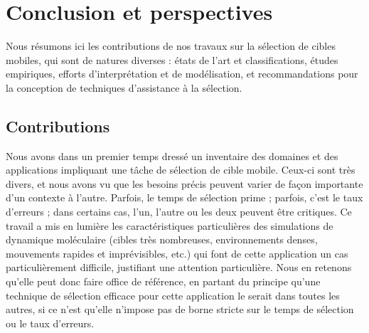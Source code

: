 


\chapter*{Conclusion et perspectives}
\mtcaddchapter %

	Nous résumons ici les contributions de nos travaux sur la sélection de cibles mobiles, qui sont de natures diverses : états de l'art et classifications, études empiriques, efforts d'interprétation et de modélisation, et recommandations pour la conception de techniques d'assistance à la sélection.

	\section*{Contributions}
	Nous avons dans un premier temps dressé un inventaire des domaines et des applications impliquant une tâche de sélection de cible mobile. Ceux-ci sont très divers, et nous avons vu que les besoins précis peuvent varier de façon importante d'un contexte à l'autre. Parfois, le temps de sélection prime ; parfois, c'est le taux d'erreurs ; dans certains cas, l'un, l'autre ou les deux peuvent être critiques. Ce travail a mis en lumière les caractéristiques particulières des simulations de dynamique moléculaire (cibles très nombreuses, environnements denses, mouvements rapides et imprévisibles, etc.) qui font de cette application un cas particulièrement difficile, justifiant une attention particulière. Nous en retenons qu'elle peut donc faire office de référence, en partant du principe qu'une technique de sélection efficace pour cette application le serait dans toutes les autres, si ce n'est qu'elle n'impose pas de borne stricte sur le temps de sélection ou le taux d'erreurs.
	
